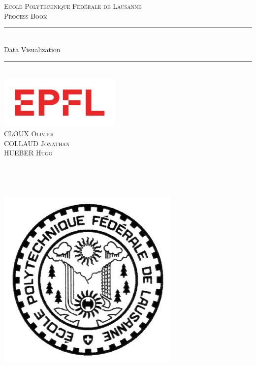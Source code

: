 \documentclass[12pt,a4paper]{article}
\newcommand{\horrule}[1]{\rule{\linewidth}{#1}} 				%
\begin{document}
\begin{titlepage}
    \vspace*{\fill}
    \begin{center}
        \normalfont \normalsize
        \textsc{Ecole Polytechnique Fédérale de Lausanne} \\ [25pt] %
        \textsc{Process Book} %
        \\ [0.4 pt]
        \horrule{0.5pt} \\[0.4cm] %
        \huge Data Visualization \\ %
        \horrule{2pt} \\[0.5cm] %
        \includegraphics[width=6cm]{EPFLlogo}
        ~\\[0.5 cm]
        \small\textsc{CLOUX Olivier}\\[0.4cm]
        \small\textsc{COLLAUD Jonathan}\\[0.4cm]
        \small\textsc{HUEBER Hugo}\\
        ~\\
        ~\\
        ~\\
        ~\\
        \includegraphics[scale=0.3]{sceau}
    \end{center}
    \vspace*{\fill}
\end{titlepage}
\end{document}
